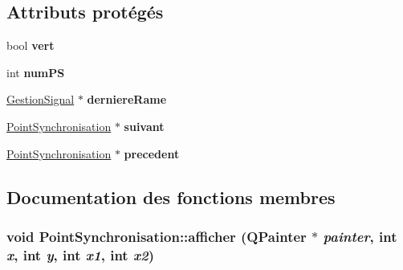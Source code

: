\subsection*{Attributs protégés}
\begin{DoxyCompactItemize}
\item 
\hypertarget{classPointSynchronisation_a1494c8728bfcd6947d6d2583dd61b218}{
bool {\bfseries vert}}
\label{classPointSynchronisation_a1494c8728bfcd6947d6d2583dd61b218}

\item 
\hypertarget{classPointSynchronisation_a42b671076eb43c988b2633783bc6edc0}{
int {\bfseries numPS}}
\label{classPointSynchronisation_a42b671076eb43c988b2633783bc6edc0}

\item 
\hypertarget{classPointSynchronisation_a850786ba609b118d5c18c84ba02be812}{
\hyperlink{classGestionSignal}{GestionSignal} $\ast$ {\bfseries derniereRame}}
\label{classPointSynchronisation_a850786ba609b118d5c18c84ba02be812}

\item 
\hypertarget{classPointSynchronisation_a280e3fc198958636a6b3f4a2d4e12a06}{
\hyperlink{classPointSynchronisation}{PointSynchronisation} $\ast$ {\bfseries suivant}}
\label{classPointSynchronisation_a280e3fc198958636a6b3f4a2d4e12a06}

\item 
\hypertarget{classPointSynchronisation_a813f00f17c496027811f2275a97964cf}{
\hyperlink{classPointSynchronisation}{PointSynchronisation} $\ast$ {\bfseries precedent}}
\label{classPointSynchronisation_a813f00f17c496027811f2275a97964cf}

\end{DoxyCompactItemize}


\subsection{Documentation des fonctions membres}
\hypertarget{classPointSynchronisation_a53db6636fdb405bb30fab20b7dc4d374}{
\subsubsection[{afficher}]{\setlength{\rightskip}{0pt plus 5cm}void PointSynchronisation::afficher (QPainter $\ast$ {\em painter}, \/  int {\em x}, \/  int {\em y}, \/  int {\em x1}, \/  int {\em x2})}}
\label{classPointSynchronisation_a53db6636fdb405bb30fab20b7dc4d374}



